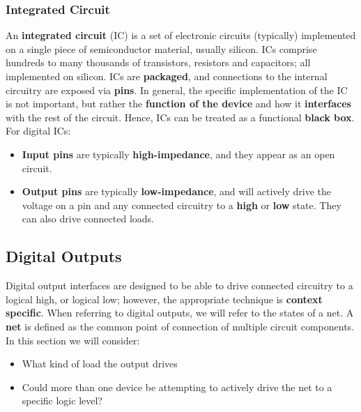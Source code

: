 \documentclass{article}
\begin{document}
\subsubsection{Integrated Circuit}
An \textbf{integrated circuit} (IC) is a set of electronic circuits
(typically) implemented on a single piece of semiconductor material,
usually silicon. ICs comprise hundreds to many thousands of
transistors, resistors and capacitors; all implemented on silicon. ICs
are \textbf{packaged}, and connections to the internal circuitry are
exposed via \textbf{pins}. In general, the specific implementation of
the IC is not important, but rather the \textbf{function of the device}
and how it \textbf{interfaces} with the rest of the circuit. Hence, ICs
can be treated as a functional \textbf{black box}. For digital ICs:
\begin{itemize}
    \item \textbf{Input pins} are typically \textbf{high-impedance}, and they appear as an open circuit.
    \item \textbf{Output pins} are typically \textbf{low-impedance}, and will actively drive the voltage
          on a pin and any connected circuitry to a \textbf{high} or \textbf{low} state. They can also
          drive connected loads.
\end{itemize}
\subsection{Digital Outputs}
Digital output interfaces are designed to be able to drive connected
circuitry to a logical high, or logical low; however, the appropriate
technique is \textbf{context specific}. When referring to digital
outputs, we will refer to the states of a net. A \textbf{net} is
defined as the common point of connection of multiple circuit
components. In this section we will consider:
\begin{itemize}
    \item What kind of load the output drives
    \item Could more than one device be attempting to actively drive
          the net to a specific logic level?
\end{itemize}
\end{document}
